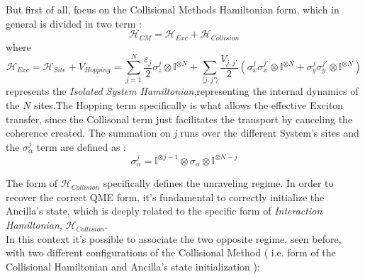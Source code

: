 \documentclass[a4paper,12pt]{article}
\begin{document}
	But first of all, focus on the Collisional Methods Hamiltonian form, which in general is divided in two term :
	\begin{equation}
		\mathcal{H}_{CM} = \mathcal{H}_{Exc} + \mathcal{H}_{Collision}
		\label{eq:CM_hamiltonian}
	\end{equation}
	where
	\begin{equation}
		\mathcal{H}_{Exc} = \mathcal{H}_{Site} + V_{Hopping} = \sum_{j=1}^{N} {\frac{\varepsilon_j}{2} \sigma_{z}^{j} \otimes \mathbb{I}^{\otimes N} } + \sum_{\langle j,j' \rangle} {\frac{V_{j,j'}}{2} \left( \sigma_{x}^{j}\sigma_{x}^{j'} \otimes \mathbb{I}^{\otimes N} + \sigma_{y}^{j}\sigma_{y}^{j'} \otimes \mathbb{I}^{\otimes N} \right)}
		\label{eq:Exc_Hamiltonian}
	\end{equation}  represents the \textit{Isolated System Hamiltonian},representing the internal dynamics of the $N$ sites.The Hopping term specifically is what allows the effective Exciton transfer, since the Collisonal term just facilitates the transport by canceling the coherence created. The summation on \textit{j} runs over the different System's sites and the  $ \sigma_{\alpha}^j $ term are defined as :
	\begin{equation}
		\sigma_{\alpha}^j  = \mathbb{I}^{\otimes j-1} \otimes \sigma_{\alpha} \otimes \mathbb{I}^{\otimes N-j}
		\label{eq:sigma_op_definition}
	\end{equation}

	The form of $ \mathcal{H}_{Collision} $ specifically defines the unraveling regime. In order to recover the correct QME form, it's fundamental to correctly initialize the Ancilla's state, which is deeply related to the specific form of \textit{Interaction Hamiltonian}, $ \mathcal{H}_{Collision} $. \\
	In this context it's possible to associate the two opposite regime, seen before, with two different configurations of the Collisional Method ( i.e. form of the Collisional Hamiltonian and Ancilla's state initialization ):
\end{document}
